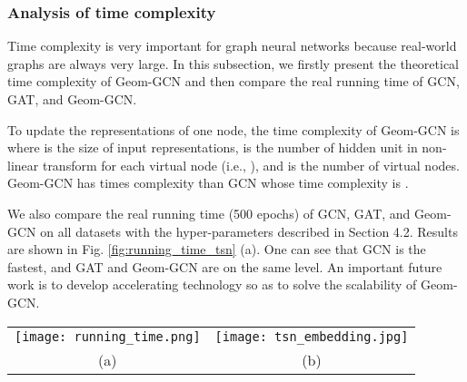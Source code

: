 \documentclass{article} \usepackage{iclr2020_conference,times}
\begin{document}
\subsubsection{Analysis of time complexity}
\vspace{-1mm}
Time complexity is very important for graph neural networks because real-world graphs are always very large. In this subsection, we  firstly present the theoretical time complexity of Geom-GCN and then compare the real running time of GCN, GAT, and Geom-GCN.

To update the representations of one node, the time complexity of Geom-GCN is  where  is the size of input representations,  is the number of hidden unit in non-linear transform for each virtual node (i.e., ), and  is the number of virtual nodes.
Geom-GCN has  times complexity than GCN whose time complexity is .

We also compare the real running time (500 epochs) of GCN, GAT, and Geom-GCN on all datasets with the hyper-parameters described in Section 4.2. 
Results are shown in Fig. \ref{fig:running_time_tsn} (a). 
One can see that GCN is the fastest, and GAT and Geom-GCN are on the same level.
An important future work is to develop accelerating technology so as to solve the scalability of Geom-GCN.


\begin{figure*}[!hbt]
\vspace{-1mm}
\centering
\begin{tabular}{cc}
\texttt{[image: running\_time.png]} &
\texttt{[image: tsn\_embedding.jpg]} \\
(a) & (b) 
\end{tabular}
\vspace{-2mm}
\caption{
(a) Running time comparison. GCN, GAT, and Geom-GCN both run 500 epochs, and  axis is the log seconds. 
GCN is the fastest, and GAT and Geom-GCN are on the same level.
(b) A visualization for the feature representations of Cora obtained from Geom-GCN-P in a 2-D space. 
Node colors denote node labels. 
There are two obvious patterns, nodes with the same label exhibit a spatial clustering and all nodes distribute radially. 
The radial pattern indicates graph's hierarchy learned by Poincare embedding.}
\vspace{-3.5 mm}
\label{fig:running_time_tsn}
\end{figure*}

\vspace{-1mm}
\end{document}
